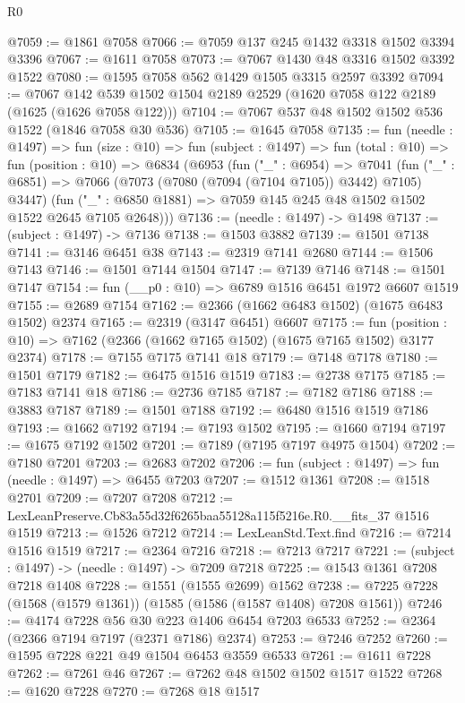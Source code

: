 \begin{lexlean}{R0}
\begin{coremodule}
@7059 := @1861 @7058
@7066 := @7059 @137 @245 @1432 @3318 @1502 @3394 @3396
@7067 := @1611 @7058
@7073 := @7067 @1430 @48 @3316 @1502 @3392 @1522
@7080 := @1595 @7058 @562 @1429 @1505 @3315 @2597 @3392
@7094 := @7067 @142 @539 @1502 @1504 @2189 @2529 (@1620 @7058 @122 @2189 (@1625 (@1626 @7058 @122)))
@7104 := @7067 @537 @48 @1502 @1502 @536 @1522 (@1846 @7058 @30 @536)
@7105 := @1645 @7058
@7135 := fun (needle : @1497) =>
  fun (size : @10) =>
  fun (subject : @1497) =>
  fun (total : @10) =>
  fun (position : @10) =>
  @6834
    (@6953
      (fun ("_" : @6954) =>
      @7041
        (fun ("_" : @6851) => @7066 (@7073 (@7080 (@7094 (@7104 @7105)) @3442) @7105) @3447)
        (fun ("_" : @6850 @1881) => @7059 @145 @245 @48 @1502 @1502 @1522 @2645 @7105 @2648)))
@7136 := (needle : @1497) -> @1498
@7137 := (subject : @1497) -> @7136
@7138 := @1503 @3882
@7139 := @1501 @7138
@7141 := @3146 @6451 @38
@7143 := @2319 @7141 @2680
@7144 := @1506 @7143
@7146 := @1501 @7144 @1504
@7147 := @7139 @7146
@7148 := @1501 @7147
@7154 := fun (__p0 : @10) => @6789 @1516 @6451 @1972 @6607 @1519
@7155 := @2689 @7154
@7162 := @2366 (@1662 @6483 @1502) (@1675 @6483 @1502) @2374
@7165 := @2319 (@3147 @6451) @6607
@7175 := fun (position : @10) => @7162 (@2366 (@1662 @7165 @1502) (@1675 @7165 @1502) @3177 @2374)
@7178 := @7155 @7175 @7141 @18
@7179 := @7148 @7178
@7180 := @1501 @7179
@7182 := @6475 @1516 @1519
@7183 := @2738 @7175
@7185 := @7183 @7141 @18
@7186 := @2736 @7185
@7187 := @7182 @7186
@7188 := @3883 @7187
@7189 := @1501 @7188
@7192 := @6480 @1516 @1519 @7186
@7193 := @1662 @7192
@7194 := @7193 @1502
@7195 := @1660 @7194
@7197 := @1675 @7192 @1502
@7201 := @7189 (@7195 @7197 @4975 @1504)
@7202 := @7180 @7201
@7203 := @2683 @7202
@7206 := fun (subject : @1497) => fun (needle : @1497) => @6455 @7203
@7207 := @1512 @1361
@7208 := @1518 @2701
@7209 := @7207 @7208
@7212 := LexLeanPreserve.Cb83a55d32f6265baa55128a115f5216e.R0.__fits_37 @1516 @1519
@7213 := @1526 @7212
@7214 := LexLeanStd.Text.find
@7216 := @7214 @1516 @1519
@7217 := @2364 @7216
@7218 := @7213 @7217
@7221 := (subject : @1497) -> (needle : @1497) -> @7209 @7218
@7225 := @1543 @1361 @7208 @7218 @1408
@7228 := @1551 (@1555 @2699) @1562
@7238 := @7225 @7228 (@1568 (@1579 @1361)) (@1585 (@1586 (@1587 @1408) @7208 @1561))
@7246 := @4174 @7228 @56 @30 @223 @1406 @6454 @7203 @6533
@7252 := @2364 (@2366 @7194 @7197 (@2371 @7186) @2374)
@7253 := @7246 @7252
@7260 := @1595 @7228 @221 @49 @1504 @6453 @3559 @6533
@7261 := @1611 @7228
@7262 := @7261 @46
@7267 := @7262 @48 @1502 @1502 @1517 @1522
@7268 := @1620 @7228
@7270 := @7268 @18 @1517

\end{coremodule}
\end{lexlean}
